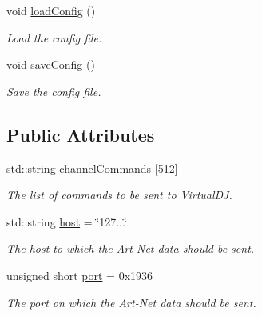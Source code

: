\begin{DoxyCompactItemize}
\mbox{\label{classConfig_a38d923d7d9553c2e92559c599937100b}} 
void \hyperlink{classConfig_a38d923d7d9553c2e92559c599937100b}{load\+Config} ()
\begin{DoxyCompactList}\small\item\em Load the config file. \end{DoxyCompactList}\item 
\mbox{\label{classConfig_a64000eb3f2292cba44278cec34fc076d}} 
void \hyperlink{classConfig_a64000eb3f2292cba44278cec34fc076d}{save\+Config} ()
\begin{DoxyCompactList}\small\item\em Save the config file. \end{DoxyCompactList}\end{DoxyCompactItemize}
\subsection*{Public Attributes}
\begin{DoxyCompactItemize}
\item 
\mbox{\label{classConfig_ada2efbde15130b44645f383ed71894ae}} 
std\+::string \hyperlink{classConfig_ada2efbde15130b44645f383ed71894ae}{channel\+Commands} \mbox{[}512\mbox{]}
\begin{DoxyCompactList}\small\item\em The list of commands to be sent to Virtual\+DJ. \end{DoxyCompactList}\item 
\mbox{\label{classConfig_aff7a38d3fada71d2d0aa7e1b01c43ea7}} 
std\+::string \hyperlink{classConfig_aff7a38d3fada71d2d0aa7e1b01c43ea7}{host} = \char`\"{}127...\char`\"{}
\begin{DoxyCompactList}\small\item\em The host to which the Art-\/\+Net data should be sent. \end{DoxyCompactList}\item 
\mbox{\label{classConfig_a5e0403fc897ee2ac5571ee45c6803d3e}} 
unsigned short \hyperlink{classConfig_a5e0403fc897ee2ac5571ee45c6803d3e}{port} = 0x1936
\begin{DoxyCompactList}\small\item\em The port on which the Art-\/\+Net data should be sent. \end{DoxyCompactList}\end{DoxyCompactItemize}
